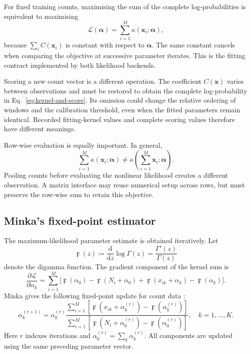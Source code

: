 For fixed training counts, maximising the sum of the complete
log-probabilities is equivalent to maximising
\[
  \mathcal{L}(\boldsymbol{\alpha})
  =\sum_{i=1}^{M}\kappa(\boldsymbol{x}_i;\boldsymbol{\alpha}),
\]
because $\sum_i C(\boldsymbol{x}_i)$ is constant with respect to
$\boldsymbol{\alpha}$. The same constant cancels when comparing the
objective at successive parameter iterates. This is the fitting contract
implemented by both likelihood backends.

Scoring a new count vector is a different operation. The coefficient
$C(\boldsymbol{x})$ varies between observations and must be restored to
obtain the complete log-probability in Eq.~\eqref{eq:kernel-and-score}.
Its omission could change the relative ordering of windows and the
calibration threshold, even when the fitted parameters remain identical.
Recorded fitting-kernel values and complete scoring values therefore have
different meanings.

Row-wise evaluation is equally important. In general,
\[
  \sum_{i=1}^{M}\kappa(\boldsymbol{x}_i;\boldsymbol{\alpha})
  \ne
  \kappa\!\left(\sum_{i=1}^{M}\boldsymbol{x}_i;
    \boldsymbol{\alpha}\right).
\]
Pooling counts before evaluating the nonlinear likelihood creates a
different observation. A matrix interface may reuse numerical setup
across rows, but must preserve the row-wise sum to retain this objective.

\subsection{Minka's fixed-point estimator}

The maximum-likelihood parameter estimate is obtained iteratively. Let
\[
  \digamma(z)\coloneqq\frac{\mathrm{d}}{\mathrm{d}z}\log\Gamma(z)
  =\frac{\Gamma'(z)}{\Gamma(z)}
\]
denote the digamma function.
The gradient component of the kernel sum is
\[
  \frac{\partial\mathcal{L}}{\partial\alpha_k}
  =\sum_{i=1}^{M}\bigl[
    \digamma(\alpha_0)-\digamma(N_i+\alpha_0)
    +\digamma(x_{ik}+\alpha_k)-\digamma(\alpha_k)\bigr].
\]
Minka gives the following fixed-point update for count data
\cite[Sec.~3, Eq.~(55)]{minka2000}:
\begin{equation}
  \alpha_k^{(r+1)}=\alpha_k^{(r)}
  \frac{\displaystyle\sum_{i=1}^{M}
    [\digamma(x_{ik}+\alpha_k^{(r)})-\digamma(\alpha_k^{(r)})]}
  {\displaystyle\sum_{i=1}^{M}
    [\digamma(N_i+\alpha_0^{(r)})-\digamma(\alpha_0^{(r)})]},
  \quad k=1,\ldots,K.
\label{eq:minka-update}
\end{equation}
Here $r$ indexes iterations and
$\alpha_0^{(r)}=\sum_k\alpha_k^{(r)}$. All components are updated using the
same preceding parameter vector.

